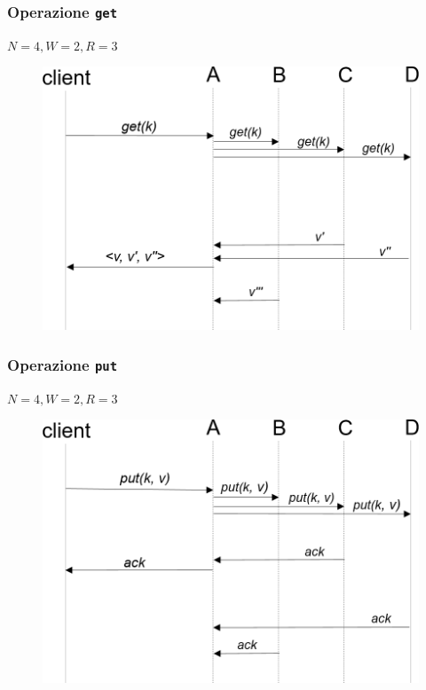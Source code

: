 \begin{frame}
  \frametitle{Operazione \texttt{get}}
  $N = 4, W = 2, R = 3$
  \begin{figure}
  \centering
  \includegraphics[scale=0.4]{dynamo/get.png}
  \end{figure}
\end{frame}


\begin{frame}
  \frametitle{Operazione \texttt{put}}
  $N = 4, W = 2, R = 3$
  \begin{figure}
  \centering
  \includegraphics[scale=0.4]{dynamo/put.png}
  \end{figure}
\end{frame}


